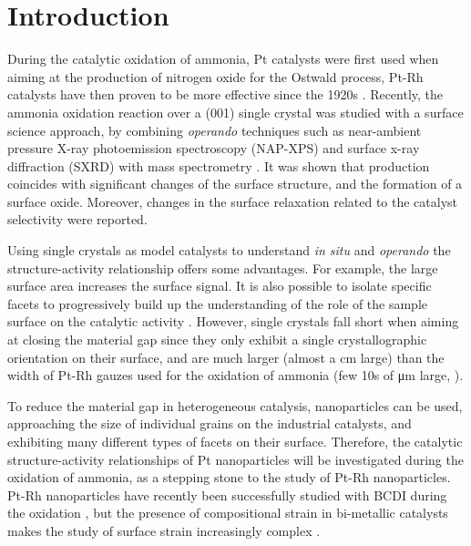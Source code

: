 \section{Introduction}

During the catalytic oxidation of ammonia, Pt catalysts were first used when aiming at the production of nitrogen oxide for the Ostwald process, Pt-Rh catalysts have then proven to be more effective since the 1920s \parencite{Handforth1934, Heck1982}.
Recently, the ammonia oxidation reaction over a (001) single crystal was studied with a surface science approach, by combining \textit{operando} techniques such as near-ambient pressure X-ray photoemission spectroscopy (NAP-XPS) and surface x-ray diffraction (SXRD) with mass spectrometry \parencite{Resta2020a}.
It was shown that  production coincides with significant changes of the surface structure, and the formation of a  surface oxide.
Moreover, changes in the surface relaxation related to the catalyst selectivity were reported.

Using single crystals as model catalysts to understand \textit{in situ} and \textit{operando} the structure-activity relationship offers some advantages.
For example, the large surface area increases the surface signal.
It is also possible to isolate specific facets to progressively build up the understanding of the role of the sample surface on the catalytic activity \parencite{Hejral2016, Resta2020a}.
However, single crystals fall short when aiming at closing the material gap since they only exhibit a single crystallographic orientation on their surface, and are much larger (almost a \unit{cm} large) than the width of Pt-Rh gauzes used for the oxidation of ammonia (few 10s of \unit{\micro\meter} large, \cite{Kaiser1909}).

To reduce the material gap in heterogeneous catalysis, nanoparticles can be used, approaching the size of individual grains on the industrial catalysts, and exhibiting many different types of facets on their surface.
Therefore, the catalytic structure-activity relationships of Pt nanoparticles will be investigated during the oxidation of ammonia, as a stepping stone to the study of Pt-Rh nanoparticles.
Pt-Rh nanoparticles have recently been successfully studied with BCDI during the  oxidation \parencite{Kim2021}, but the presence of compositional strain in bi-metallic catalysts makes the study of surface strain increasingly complex \parencite{Kawaguchi2019}.

